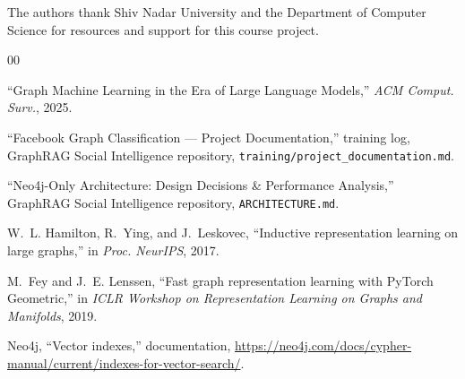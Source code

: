 \documentclass[conference]{IEEEtran}
\begin{document}
The authors thank Shiv Nadar University and the Department of Computer Science for resources and support for this course project.


\begin{thebibliography}{00}

``Graph Machine Learning in the Era of Large Language Models,'' \emph{ACM Comput. Surv.}, 2025.

``Facebook Graph Classification --- Project Documentation,'' training log, GraphRAG Social Intelligence repository, \texttt{training/project\_documentation.md}.

``Neo4j-Only Architecture: Design Decisions \& Performance Analysis,'' GraphRAG Social Intelligence repository, \texttt{ARCHITECTURE.md}.

W.~L. Hamilton, R.~Ying, and J.~Leskovec, ``Inductive representation learning on large graphs,'' in \emph{Proc. NeurIPS}, 2017.

M.~Fey and J.~E. Lenssen, ``Fast graph representation learning with PyTorch Geometric,'' in \emph{ICLR Workshop on Representation Learning on Graphs and Manifolds}, 2019.

Neo4j, ``Vector indexes,'' documentation, \url{https://neo4j.com/docs/cypher-manual/current/indexes-for-vector-search/}.

\end{thebibliography}
\end{document}
